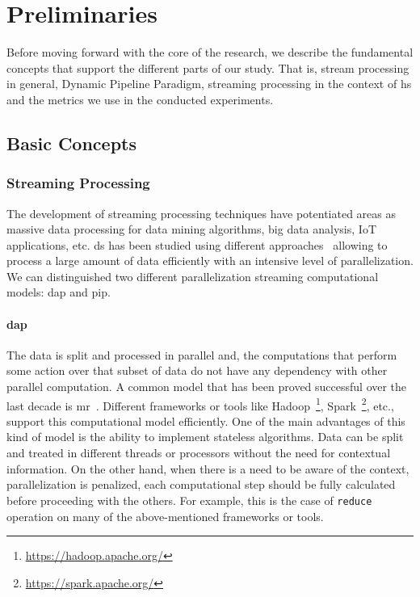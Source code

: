 \section{Preliminaries}\label{prelim}
Before moving forward with the core of the research, we describe the fundamental concepts that support the different parts of our study. That is, stream processing in general, Dynamic Pipeline Paradigm, streaming processing in the context of \acrshort{hs} and the metrics we use in the conducted experiments.
\subsection{Basic Concepts}
\subsubsection{Streaming Processing}
The development of streaming processing techniques  have potentiated areas as massive data processing for data mining algorithms, big data analysis, IoT applications, etc.  
\acrfull{ds} has been studied using different approaches~\cite{exploiting, onthefly} allowing to process a large amount of data efficiently with an intensive level of parallelization.
We can distinguished two different parallelization streaming computational models: \acrfull{dap} and \acrfull{pip}. 

\paragraph{\acrfull{dap}} The data is split and processed in parallel and, the computations that perform some action over that subset of data do not have any dependency with other parallel computation. 
A common model that has been proved successful over the last decade is \acrfull{mr}~\cite{mapreduce}. Different frameworks or tools like Hadoop~\footnote{\url{https://hadoop.apache.org/}}, Spark~\footnote{\url{https://spark.apache.org/}}, etc., support this computational model efficiently. 
One of the main advantages of this kind of model is the ability to implement stateless algorithms. Data can be split and treated in different threads or processors without the need for contextual information. 
On the other hand, when there is a need to be aware of the context, parallelization is penalized, each computational step should be fully calculated before proceeding with the others. 
For example, this is the case of \texttt{reduce} operation on many of the above-mentioned frameworks or tools.

